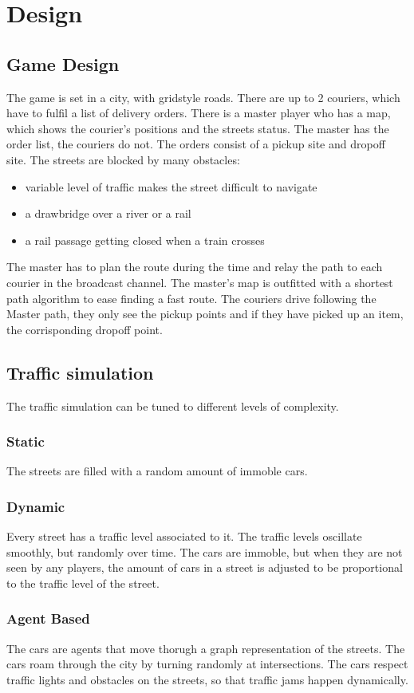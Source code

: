 \documentclass{article}
\begin{document}
\clearpage

\section{Design}
\subsection{Game Design}
The game is set in a city, with gridstyle roads.
There are up to 2 couriers, which have to fulfil a list of delivery orders.
There is a master player who has a map, which shows the courier's positions and the streets status. The master has the order list, the couriers do not.
The orders consist of a pickup site and dropoff site.
The streets are blocked by many obstacles:
\begin{itemize}
  \item variable level of traffic makes the street difficult to navigate
  \item a drawbridge over a river or a rail
  \item a rail passage getting closed when a train crosses
\end{itemize}
The master has to plan the route during the time and relay the path to each courier in the broadcast channel.
The master's map is outfitted with a shortest path algorithm to ease finding a fast route.
The couriers drive following the Master path, they only see the pickup points and if they have picked up an item, the corrisponding dropoff point.
\subsection{Traffic simulation}
The traffic simulation can be tuned to different levels of complexity.
\subsubsection{Static}
The streets are filled with a random amount of immoble cars.
\subsubsection{Dynamic}
Every street has a traffic level associated to it. The traffic levels oscillate smoothly, but randomly over time. The cars are immoble, but when they are not seen by any players, the amount of cars in a street is adjusted to be proportional to the traffic level of the street.
\subsubsection{Agent Based}
The cars are agents that move thorugh a graph representation of the streets. The cars roam through the city by turning randomly at intersections. The cars respect traffic lights and obstacles on the streets, so that traffic jams happen dynamically.
\end{document}

